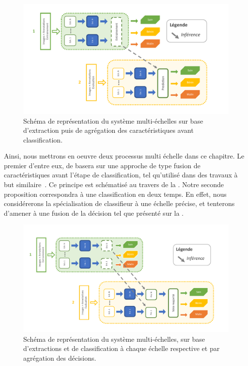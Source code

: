 \begin{figure}[H]
    \centering
    \includegraphics[width=\linewidth]{contents/chapter_5/resources/scheme_multiscale_features.pdf}
    \caption{Schéma de représentation du système multi-échelles sur base d'extraction puis de agrégation des caractéristiques avant classification.}
    \label{fig:scheme_multiscale_features}
\end{figure}\par

Ainsi, nous mettrons en oeuvre deux processus multi échelle dans ce chapitre. Le premier d'entre eux, de basera sur une approche de type fusion de caractéristiques avant l'étape de classification, tel qu'utilisé dans des travaux à but similaire~\cite{Pedersoli2011,Alsaih2016}. Ce principe est schématisé au travers de la . Notre seconde proposition correspondra à une classification en deux temps. En effet, nous considérerons la spécialisation de classifieur à une échelle précise, et tenterons d'amener à une fusion de la décision tel que présenté sur la .\par

\begin{figure}[H]
    \centering
    \includegraphics[width=\linewidth]{contents/chapter_5/resources/scheme_multiscale_decision.pdf}
    \caption{Schéma de représentation du système multi-échelles, sur base d'extractions et de classification à chaque échelle respective et par agrégation des décisions.}
    \label{fig:scheme_multiscale_decision}
\end{figure}\par


